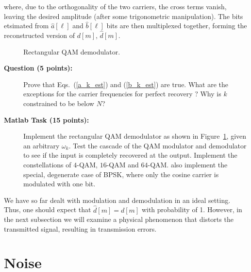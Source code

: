 \documentclass[letterpaper,12pt]{article}
\newcounter{questioncnt}
\newcounter{matlabcnt}
\begin{document}
where, due to the orthogonality of the two carriers, the cross
terms vanish, leaving the desired amplitude (after some
trigonometric manipulation). %
 The bits etsimated from $\hat{a}[\ell]$ and $\hat{b}[\ell]$  bits are then
multiplexed together, forming the reconstructed
version of $d[m]$, $\hat{d}[m]$.

\begin{figure}[t]
\centering
\scalebox{.5}{}%
\caption{Rectangular QAM demodulator.}\label{qam_demod}
\end{figure}

\begin{description}
    \item[{\bf Question  (5 points):}]
    Prove that Eqs.~(\ref{a_k_est}) and (\ref{b_k_est}) are true. What are the exceptions
    for the carrier frequencies for perfect recovery%
? Why is $k$  constrained to be
    below $N$?
\end{description}

\begin{description}
    \item[{\bf Matlab Task  (15 points):}]
    Implement the rectangular QAM demodulator %
    as shown in Figure~\ref{qam_demod}, given an arbitrary
    $\omega_k$. Test the cascade of the QAM modulator and
    demodulator to see if the input is completely recovered at the
    output. Implement the constellations of $4$-QAM, $16$-QAM and
    $64$-QAM. also implement the special, degenerate case of BPSK, where only
    the cosine carrier is modulated with one bit.
\end{description}


We have so far dealt with modulation and demodulation in an ideal
setting. Thus, one should expect that $\hat{d}[m]=d[m]$ with
probability of 1. However, in the next subsection we will examine
a physical phenomenon that distorts the transmitted signal,
resulting in transmission errors.


\section{Noise}\label{noisesubsection}
\end{document}
